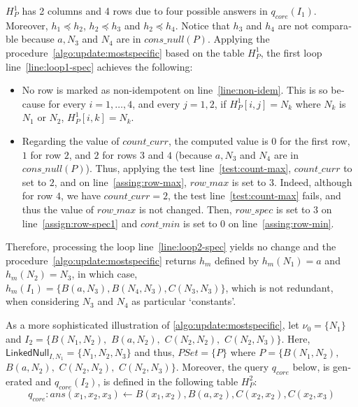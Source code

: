 \begin{otherlanguage}{english}
\begin{example}
    $H_P^1$ has 2 columns and 4 rows due to four possible answers in $q_{core}(I_1)$.
    Moreover, $h_1 \preceq h_2$, $h_2 \preceq h_3$ and $h_2 \preceq h_4$.
    Notice that $h_3$ and $h_4$ are not comparable because $a, N_3$ and $N_4$ are in $cons\_null(P)$.
    Applying the procedure~\ref{algo:update:mostspecific} based on the table $H_P^1$, the first loop line~\ref{line:loop1-spec} achieves the following:
    \begin{itemize}
        \item
              No row is marked as non-idempotent on line~\ref{line:non-idem}.
              This is so because for every $i=1, \ldots, 4$, and every $j=1,2$, if $H^1_P[i,j]=N_k$ where $N_k$ is $N_1$ or $N_2$, $H^1_P[i,k]=N_k$.
        \item Regarding the value of $count\_curr$, the computed value is $0$ for the first row, $1$ for row $2$, and $2$ for rows $3$ and $4$ (because $a, N_3$ and $N_4$ are in $cons\_null(P)$).
              Thus, applying the test line~\ref{test:count-max}, $count\_curr$ to set to $2$, and on line~\ref{assing:row-max}, $row\_max$ is set to $3$.
              Indeed, although for row $4$, we have $count\_curr = 2$, the test line~\ref{test:count-max} fails, and thus the value of $row\_max$ is not changed.
              Then, $row\_spec$ is set to $3$ on line~\ref{assign:row-spec1} and $cont\_min$ is set to $0$ on line~\ref{assing:row-min}.
    \end{itemize}
    Therefore, processing the loop line~\ref{line:loop2-spec} yields no change and the procedure~\ref{algo:update:mostspecific} returns $h_m$ defined by $h_m(N_1)=a$ and $h_m(N_2)=N_3$, in which case, $h_m(I_1)=\{B(a, N_3), B(N_4,N_3), C(N_3,N_3)\}$, which is not redundant, when considering $N_3$ and $N_4$ as particular `constants'.

    As a more sophisticated illustration of \ref{algo:update:mostspecific}, let $\nu_0=\{N_1\}$ and $I_2= \{B(N_1, N_2),$ $B(a, N_2),$ $C(N_2,N_2),$ $C(N_2,N_3)\}$.
    Here, $\textsf{LinkedNull}_{I,N_1}=\{N_1,N_2, N_3\}$ and thus, $PSet = \{P\}$ where $P=\{B(N_1, N_2),$ $B(a,N_2),$ $C(N_2,N_2),$ $C(N_2,N_3)\}$.
    Moreover, the query $q_{core}$ below, is generated and $q_{core}(I_2)$, is defined in the following table $H^2_P$:
    \[
        q_{core}:ans(x_1,x_2,x_3) \leftarrow B(x_1, x_2), B(a,x_2),C(x_2,x_2),C(x_2,x_3)
    \]


\end{example}
\end{otherlanguage}
